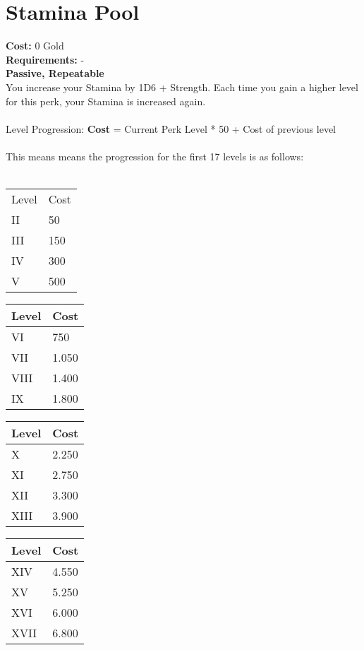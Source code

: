 \section*{Stamina Pool}\label{sec:staminapool}
\textbf{Cost:} 0 Gold\\
\textbf{Requirements:} -\\
\textbf{Passive, Repeatable}\\
You increase your Stamina by 1D6 + Strength.
Each time you gain a higher level for this perk, your Stamina is increased again.\\
\\
Level Progression: \textbf{Cost} = Current Perk Level * 50 + Cost of previous level\\
\\
This means means the progression for the first 17 levels is as follows:\\
\\
\begin{minipage}{0.25\textwidth}
    \begin{tabular}{l | l}
        Level & Cost\\
        II & 50\\
        III & 150\\
        IV & 300\\
        V & 500\\
    \end{tabular}
\end{minipage}
\begin{minipage}{0.25\textwidth}
    \begin{tabular}{l | l}
        Level & Cost\\ \hline
        VI & 750\\
        VII & 1.050\\
        VIII & 1.400\\
        IX & 1.800\\
    \end{tabular}
\end{minipage}
\begin{minipage}{0.25\textwidth}
    \begin{tabular}{l | l}
        Level & Cost\\ \hline
        X & 2.250\\
        XI & 2.750\\
        XII & 3.300\\
        XIII & 3.900\\
    \end{tabular}
\end{minipage}
\begin{minipage}{0.25\textwidth}
    \begin{tabular}{l | l}
        Level & Cost\\ \hline
        XIV & 4.550\\
        XV & 5.250\\
        XVI & 6.000\\
        XVII & 6.800\\
    \end{tabular}
\end{minipage}